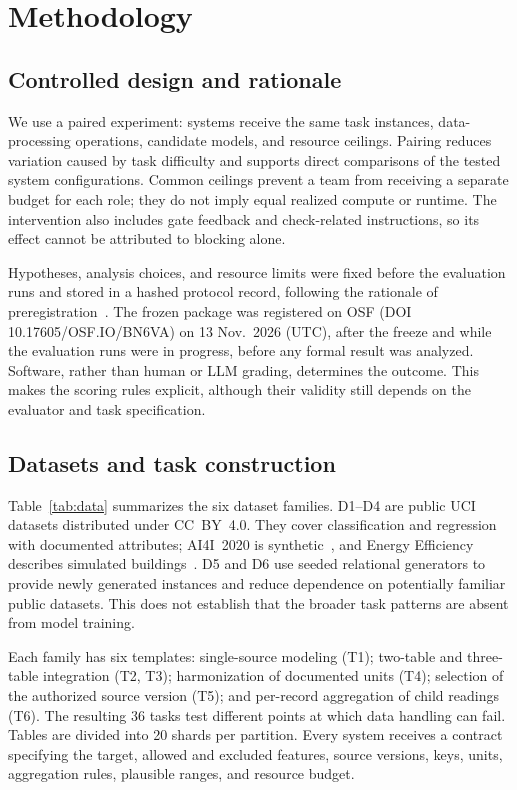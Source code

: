 \documentclass[conference]{IEEEtran}
\begin{document}
\section{Methodology}
\label{sec:method}
\subsection{Controlled design and rationale}
We use a paired experiment: systems receive the same task instances, data-processing operations, candidate models, and resource ceilings. Pairing reduces variation caused by task difficulty and supports direct comparisons of the tested system configurations. Common ceilings prevent a team from receiving a separate budget for each role; they do not imply equal realized compute or runtime. The intervention also includes gate feedback and check-related instructions, so its effect cannot be attributed to blocking alone.

Hypotheses, analysis choices, and resource limits were fixed before the evaluation runs and stored in a hashed protocol record, following the rationale of preregistration~\cite{nosek2018prereg}. The frozen package was registered on OSF (DOI 10.17605/OSF.IO/BN6VA) on 13 Nov.\ 2026 (UTC), after the freeze and while the evaluation runs were in progress, before any formal result was analyzed. Software, rather than human or LLM grading, determines the outcome. This makes the scoring rules explicit, although their validity still depends on the evaluator and task specification.

\subsection{Datasets and task construction}
\label{sec:bench}
Table~\ref{tab:data} summarizes the six dataset families. D1--D4 are public UCI datasets distributed under CC~BY~4.0. They cover classification and regression with documented attributes; AI4I~2020 is synthetic~\cite{matzka2020ai4i}, and Energy Efficiency describes simulated buildings~\cite{tsanas2012energy}. D5 and D6 use seeded relational generators to provide newly generated instances and reduce dependence on potentially familiar public datasets. This does not establish that the broader task patterns are absent from model training.

Each family has six templates: single-source modeling (T1); two-table and three-table integration (T2, T3); harmonization of documented units (T4); selection of the authorized source version (T5); and per-record aggregation of child readings (T6). The resulting 36 tasks test different points at which data handling can fail. Tables are divided into 20 shards per partition. Every system receives a contract specifying the target, allowed and excluded features, source versions, keys, units, aggregation rules, plausible ranges, and resource budget.
\end{document}
